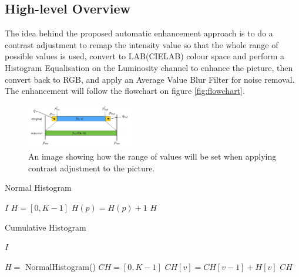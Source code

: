 \documentclass[journal,transmag]{IEEEtran}
\begin{document}
\subsection{High-level Overview}
The idea behind the proposed automatic enhancement approach is to do a contrast adjustment to remap the intensity value so that the whole range of possible values is used, convert to LAB(CIELAB) colour space and perform a Histogram Equalisation on the Luminosity channel to enhance the picture, then convert back to RGB, and apply an Average Value Blur Filter for noise removal. The enhancement will follow the flowchart on figure \ref{fig:flowchart}.

\begin{figure}[h!]
\centering
\includegraphics[width=0.42\textwidth]{figures/contrAdj.png}
\caption{An image showing how the range of values will be set when applying contrast adjustment to the picture.}
\label{fig:contrAdj}
\end{figure}

\begin{algorithm}[bh!] %
	\caption{Normal Histogram}
	\label{alg:norm_hist}
	\begin{algorithmic}[1]
		 {$I$} 
		\State $H = [0, K-1]$
		\State 
		\State $H(p) = H(p) + 1$
		\EndFor
		\State 
		\State
		\Return $H$
		\EndFunction
	\end{algorithmic}
\end{algorithm}
\begin{algorithm}[bh!]%
	\caption{Cumulative Histogram}
	\label{alg:cum_hist}
	\begin{algorithmic}[1]
		 {$I$} 

		\State $H = $ NormalHistogram()
		\State $CH = [0, K-1]$
		\State
		\State $CH[v] = CH[v-1] + H[v]$
		\EndFor
		\State 
		\State
		\Return $CH$
		\EndFunction
	\end{algorithmic}
\end{algorithm}
\end{document}

